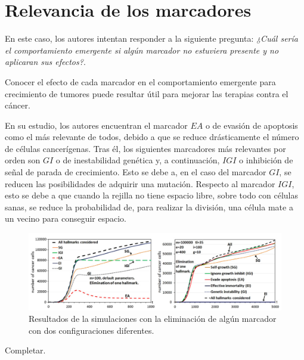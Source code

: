 \section{Relevancia de los marcadores}

En este caso, los autores intentan responder a la siguiente pregunta: \textit{¿Cuál sería
el comportamiento emergente si algún marcador no estuviera presente y no aplicaran
sus efectos?}.

Conocer el efecto de cada marcador en el comportamiento emergente para crecimiento de tumores
puede resultar útil para mejorar las terapias contra el cáncer.

En su estudio, los autores encuentran el marcador $EA$ o de evasión de apoptosis como el más
relevante de todos, debido a que se reduce drásticamente el número de células cancerígenas.
Tras él, los siguientes marcadores más relevantes por orden son $GI$ o de inestabilidad genética y,
a continuación, $IGI$ o inhibición de señal de parada de crecimiento. Esto se debe a, en el caso
del marcador $GI$, se reducen las posibilidades de adquirir una mutación. Respecto al marcador $IGI$,
esto se debe a que cuando la rejilla no tiene espacio libre, sobre todo con células sanas, se reduce
la probabilidad de, para realizar la división, una célula mate a un vecino para conseguir espacio.

\begin{figure}[h]
\centering
\includegraphics[scale=0.5]{figures/experiments/exp6}
\caption{Resultados de la simulaciones con la eliminación de algún marcador con dos configuraciones diferentes.}
\label{fig:exp6}
\end{figure}

Completar.
